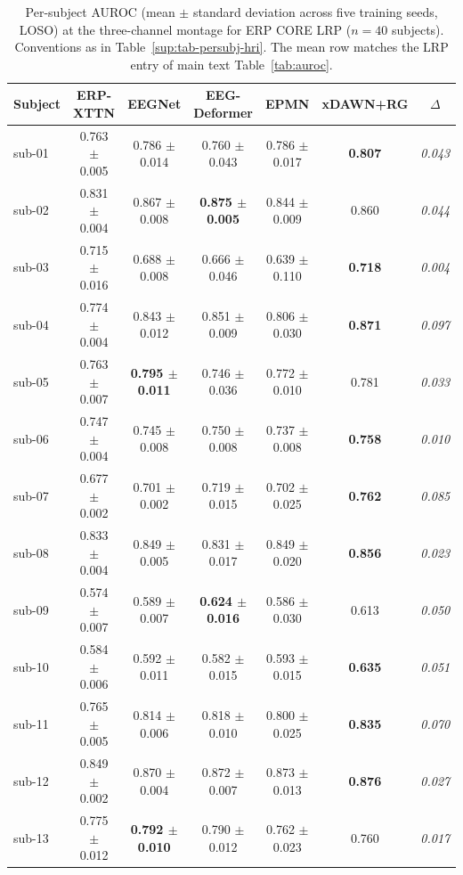 \begin{table}[t]
\centering
\caption{%
Per-subject AUROC (mean $\pm$ standard deviation across five training seeds, LOSO) at the three-channel montage for ERP CORE LRP ($n = 40$ subjects). Conventions as in Table~\ref{sup:tab-persubj-hri}. The mean row matches the LRP entry of main text Table~\ref{tab:auroc}.%
}
\label{sup:tab-persubj-lrp}
\begin{tabular}{lcccccc}
\toprule
Subject & ERP-XTTN & EEGNet & EEG-Deformer & EPMN & xDAWN+RG & $\Delta$ \\
\midrule
sub-01 & 0.763 $\pm$ 0.005 & 0.786 $\pm$ 0.014 & 0.760 $\pm$ 0.043 & 0.786 $\pm$ 0.017 & \textbf{0.807} & \textit{0.043} \\
sub-02 & 0.831 $\pm$ 0.004 & 0.867 $\pm$ 0.008 & \textbf{0.875 $\pm$ 0.005} & 0.844 $\pm$ 0.009 & 0.860 & \textit{0.044} \\
sub-03 & 0.715 $\pm$ 0.016 & 0.688 $\pm$ 0.008 & 0.666 $\pm$ 0.046 & 0.639 $\pm$ 0.110 & \textbf{0.718} & \textit{0.004} \\
sub-04 & 0.774 $\pm$ 0.004 & 0.843 $\pm$ 0.012 & 0.851 $\pm$ 0.009 & 0.806 $\pm$ 0.030 & \textbf{0.871} & \textit{0.097} \\
sub-05 & 0.763 $\pm$ 0.007 & \textbf{0.795 $\pm$ 0.011} & 0.746 $\pm$ 0.036 & 0.772 $\pm$ 0.010 & 0.781 & \textit{0.033} \\
sub-06 & 0.747 $\pm$ 0.004 & 0.745 $\pm$ 0.008 & 0.750 $\pm$ 0.008 & 0.737 $\pm$ 0.008 & \textbf{0.758} & \textit{0.010} \\
sub-07 & 0.677 $\pm$ 0.002 & 0.701 $\pm$ 0.002 & 0.719 $\pm$ 0.015 & 0.702 $\pm$ 0.025 & \textbf{0.762} & \textit{0.085} \\
sub-08 & 0.833 $\pm$ 0.004 & 0.849 $\pm$ 0.005 & 0.831 $\pm$ 0.017 & 0.849 $\pm$ 0.020 & \textbf{0.856} & \textit{0.023} \\
sub-09 & 0.574 $\pm$ 0.007 & 0.589 $\pm$ 0.007 & \textbf{0.624 $\pm$ 0.016} & 0.586 $\pm$ 0.030 & 0.613 & \textit{0.050} \\
sub-10 & 0.584 $\pm$ 0.006 & 0.592 $\pm$ 0.011 & 0.582 $\pm$ 0.015 & 0.593 $\pm$ 0.015 & \textbf{0.635} & \textit{0.051} \\
sub-11 & 0.765 $\pm$ 0.005 & 0.814 $\pm$ 0.006 & 0.818 $\pm$ 0.010 & 0.800 $\pm$ 0.025 & \textbf{0.835} & \textit{0.070} \\
sub-12 & 0.849 $\pm$ 0.002 & 0.870 $\pm$ 0.004 & 0.872 $\pm$ 0.007 & 0.873 $\pm$ 0.013 & \textbf{0.876} & \textit{0.027} \\
sub-13 & 0.775 $\pm$ 0.012 & \textbf{0.792 $\pm$ 0.010} & 0.790 $\pm$ 0.012 & 0.762 $\pm$ 0.023 & 0.760 & \textit{0.017} \\

\end{tabular}
\end{table}
